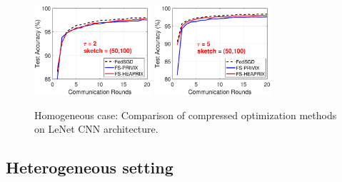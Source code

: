 \documentclass[twoside]{article}
\begin{document}
\begin{figure}[H]
\begin{center}
{%
		\includegraphics[width=1.7in]{MNIST_figures/local2_sketch50_iid1_test_acc.eps} \hspace{-0.2in}
		\includegraphics[width=1.7in]{MNIST_figures/local5_sketch50_iid1_test_acc.eps}\hspace{-0.2in}
		}
	\end{center}
	\caption{Homogeneous case: Comparison of compressed optimization methods on LeNet CNN architecture.}
    \label{fig:MNIST-iid1}
\end{figure}

\subsection{Heterogeneous setting}
\end{document}
